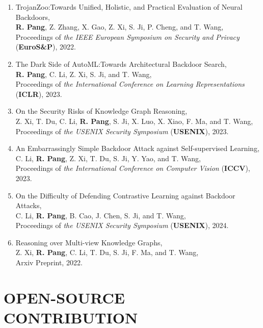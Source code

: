 \documentclass[letterpaper,11pt]{article}
\begin{document}
\begin{enumerate}[labelsep=15pt, parsep=-4pt]
    \item TrojanZoo:\@ Towards Unified, Holistic, and Practical Evaluation of Neural Backdoors,\\
    \textbf{R. Pang}, Z. Zhang, X. Gao, Z. Xi, S. Ji, P. Cheng, and T. Wang,\\
    Proceedings of {\it the IEEE European Symposium on Security and Privacy\/} (\textbf{EuroS\&P}), 2022.
    
    \item The Dark Side of AutoML:\@ Towards Architectural Backdoor Search,\\
    \textbf{R. Pang}, C. Li, Z. Xi, S. Ji, and T. Wang,\\
    Proceedings of {\it the International Conference on Learning Representations\/} (\textbf{ICLR}), 2023.
    
    \item On the Security Risks of Knowledge Graph Reasoning,\\
    Z. Xi, T. Du, C. Li, \textbf{R. Pang}, S. Ji, X. Luo, X. Xiao, F. Ma, and T. Wang,\\
    Proceedings of {\it the USENIX Security Symposium\/} (\textbf{USENIX}), 2023.
    
    \item An Embarrassingly Simple Backdoor Attack against Self-supervised Learning,\\
    C. Li, \textbf{R. Pang}, Z. Xi, T. Du, S. Ji, Y. Yao, and T. Wang,\\
    Proceedings of {\it the International Conference on Computer Vision\/} (\textbf{ICCV}), 2023.

    \item On the Difficulty of Defending Contrastive Learning against Backdoor Attacks,\\
    C. Li, \textbf{R. Pang}, B. Cao, J. Chen, S. Ji, and T. Wang,\\
    Proceedings of {\it the USENIX Security Symposium\/} (\textbf{USENIX}), 2024.

    \item Reasoning over Multi-view Knowledge Graphs,\\
    Z. Xi, \textbf{R. Pang}, C. Li, T. Du, S. Ji, F. Ma, and T. Wang,\\
    Arxiv Preprint, 2022.

    \end{enumerate}


\section{OPEN-SOURCE CONTRIBUTION}
\end{document}
